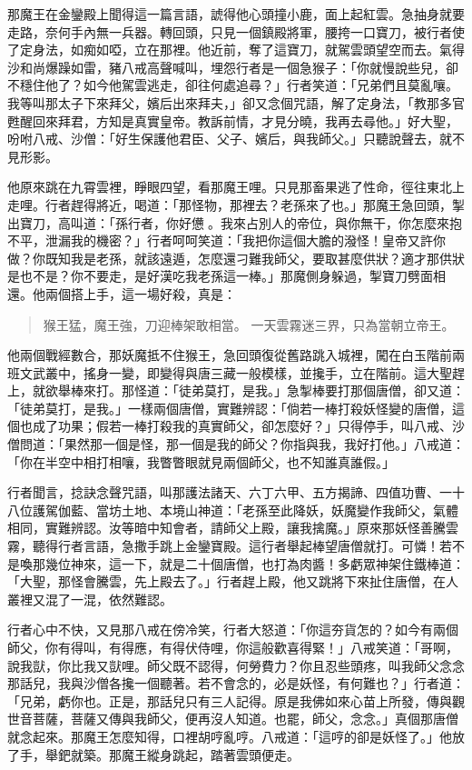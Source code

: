那魔王在金鑾殿上聞得這一篇言語，諕得他心頭撞小鹿，面上起紅雲。急抽身就要走路，奈何手內無一兵器。轉回頭，只見一個鎮殿將軍，腰挎一口寶刀，被行者使了定身法，如痴如啞，立在那裡。他近前，奪了這寶刀，就駕雲頭望空而去。氣得沙和尚爆躁如雷，豬八戒高聲喊叫，埋怨行者是一個急猴子：「你就慢說些兒，卻不穩住他了？如今他駕雲逃走，卻往何處追尋？」行者笑道：「兄弟們且莫亂嚷。我等叫那太子下來拜父，嬪后出來拜夫，」卻又念個咒語，解了定身法，「教那多官甦醒回來拜君，方知是真實皇帝。教訴前情，才見分曉，我再去尋他。」好大聖，吩咐八戒、沙僧：「好生保護他君臣、父子、嬪后，與我師父。」只聽說聲去，就不見形影。

他原來跳在九霄雲裡，睜眼四望，看那魔王哩。只見那畜果逃了性命，徑往東北上走哩。行者趕得將近，喝道：「那怪物，那裡去？老孫來了也。」那魔王急回頭，掣出寶刀，高叫道：「孫行者，你好憊𪬯。我來占別人的帝位，與你無干，你怎麼來抱不平，泄漏我的機密？」行者呵呵笑道：「我把你這個大膽的潑怪！皇帝又許你做？你既知我是老孫，就該遠遁，怎麼還刁難我師父，要取甚麼供狀？適才那供狀是也不是？你不要走，是好漢吃我老孫這一棒。」那魔側身躲過，掣寶刀劈面相還。他兩個搭上手，這一場好殺，真是：
\begin{quote}
猴王猛，魔王強，刀迎棒架敢相當。
一天雲霧迷三界，只為當朝立帝王。
\end{quote}

他兩個戰經數合，那妖魔抵不住猴王，急回頭復從舊路跳入城裡，闖在白玉階前兩班文武叢中，搖身一變，即變得與唐三藏一般模樣，並攙手，立在階前。這大聖趕上，就欲舉棒來打。那怪道：「徒弟莫打，是我。」急掣棒要打那個唐僧，卻又道：「徒弟莫打，是我。」一樣兩個唐僧，實難辨認：「倘若一棒打殺妖怪變的唐僧，這個也成了功果；假若一棒打殺我的真實師父，卻怎麼好？」只得停手，叫八戒、沙僧問道：「果然那一個是怪，那一個是我的師父？你指與我，我好打他。」八戒道：「你在半空中相打相嚷，我瞥瞥眼就見兩個師父，也不知誰真誰假。」

行者聞言，捻訣念聲咒語，叫那護法諸天、六丁六甲、五方揭諦、四值功曹、一十八位護駕伽藍、當坊土地、本境山神道：「老孫至此降妖，妖魔變作我師父，氣體相同，實難辨認。汝等暗中知會者，請師父上殿，讓我擒魔。」原來那妖怪善騰雲霧，聽得行者言語，急撒手跳上金鑾寶殿。這行者舉起棒望唐僧就打。可憐！若不是喚那幾位神來，這一下，就是二十個唐僧，也打為肉醬！多虧眾神架住鐵棒道：「大聖，那怪會騰雲，先上殿去了。」行者趕上殿，他又跳將下來扯住唐僧，在人叢裡又混了一混，依然難認。

行者心中不快，又見那八戒在傍冷笑，行者大怒道：「你這夯貨怎的？如今有兩個師父，你有得叫，有得應，有得伏侍哩，你這般歡喜得緊！」八戒笑道：「哥啊，說我獃，你比我又獃哩。師父既不認得，何勞費力？你且忍些頭疼，叫我師父念念那話兒，我與沙僧各攙一個聽著。若不會念的，必是妖怪，有何難也？」行者道：「兄弟，虧你也。正是，那話兒只有三人記得。原是我佛如來心苗上所發，傳與觀世音菩薩，菩薩又傳與我師父，便再沒人知道。也罷，師父，念念。」真個那唐僧就念起來。那魔王怎麼知得，口裡胡哼亂哼。八戒道：「這哼的卻是妖怪了。」他放了手，舉鈀就築。那魔王縱身跳起，踏著雲頭便走。

